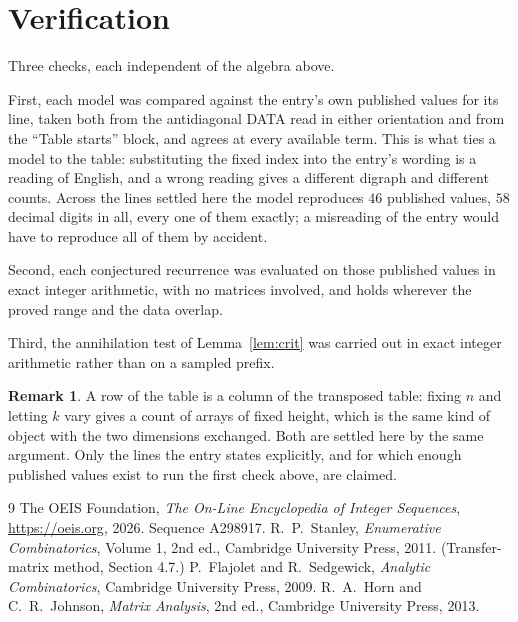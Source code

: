 \documentclass[11pt,a4paper]{article}
\theoremstyle{plain}
\theoremstyle{definition}
\newtheorem{remark}[theorem]{Remark}
\begin{document}
\section{Verification}

Three checks, each independent of the algebra above.

First, each model was compared against the entry's own published values for its line, taken
both from the antidiagonal DATA read in either orientation and from the ``Table starts''
block, and agrees at every available term. This is what ties a model to the table:
substituting the fixed index into the entry's wording is a reading of English, and a wrong
reading gives a different digraph and different counts. Across the lines settled here the
model reproduces $46$ published values, $58$ decimal digits in all, every one of
them exactly; a misreading of the entry would have to reproduce all of them by accident.

Second, each conjectured recurrence was evaluated on those published values in exact
integer arithmetic, with no matrices involved, and holds wherever the proved range and the
data overlap.

Third, the annihilation test of Lemma~\ref{lem:crit} was carried out in exact integer
arithmetic rather than on a sampled prefix.

\begin{remark}
A row of the table is a column of the transposed table: fixing $n$ and letting $k$ vary gives a
count of arrays of fixed height, which is the same kind of object with the two dimensions
exchanged. Both are settled here by the same argument. Only the lines the entry states
explicitly, and for which enough published values exist to run the first check above, are
claimed.
\end{remark}

\begin{thebibliography}{9}
 The OEIS Foundation, \emph{The On-Line Encyclopedia of Integer
Sequences}, \url{https://oeis.org}, 2026. Sequence A298917.
 R.~P.~Stanley, \emph{Enumerative Combinatorics}, Volume 1, 2nd ed.,
Cambridge University Press, 2011. (Transfer-matrix method, Section 4.7.)
 P.~Flajolet and R.~Sedgewick, \emph{Analytic Combinatorics}, Cambridge
University Press, 2009.
 R.~A.~Horn and C.~R.~Johnson, \emph{Matrix Analysis}, 2nd ed., Cambridge
University Press, 2013.
\end{thebibliography}
\end{document}
